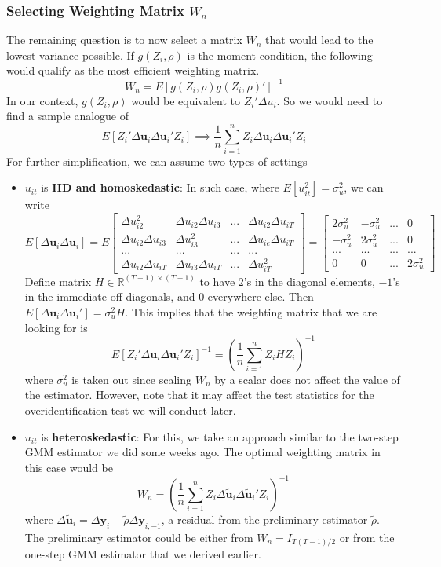 \documentclass[12pt]{article}
\theoremstyle{definition}
\theoremstyle{property}
\theoremstyle{assumption}
\theoremstyle{example}
\theoremstyle{comment}
\begin{document}
\subsubsection{Selecting Weighting Matrix $W_n$}
The remaining question is to now select a matrix $W_n$ that would lead to the lowest variance possible. If $g(Z_i,\rho)$ is the moment condition, the following would qualify as the most efficient weighting matrix.
\[
W_n = E[g(Z_i,\rho)g(Z_i,\rho)']^{-1}
\]
In our context, $g(Z_i,\rho)$ would be equivalent to $Z_i'\Delta u_i$. So we would need to find a sample analogue of
\[
E[Z_i'\Delta \mathbf{u}_i \Delta \mathbf{u}_i'Z_i] \implies \frac{1}{n}\sum_{i=1}^nZ_i\Delta \mathbf{u}_i \Delta \mathbf{u}_i' Z_i
\]
For further simplification, we can assume two types of settings
\begin{itemize}
\item $u_{it}$ is \textbf{IID and homoskedastic}: In such case, where $E[u_{it}^2]=\sigma_u^2$,  we can write
\[
E[\Delta \mathbf{u}_i \Delta \mathbf{u}_i]=E\begin{bmatrix}\Delta u_{i2}^2 & \Delta u_{i2}\Delta u_{i3} & ... & \Delta u_{i2}\Delta u_{iT} \\\Delta u_{i2}\Delta u_{i3} & \Delta u_{i3}^2 & ... & \Delta u_{ie}\Delta u_{iT}\\ ... & ...  & ... & ... \\  \Delta u_{i2}\Delta u_{iT} & \Delta u_{i3}\Delta u_{iT} & ... & \Delta u_{iT}^2  \end{bmatrix}=\begin{bmatrix}2\sigma_u^2& -\sigma_u^2 &... &0\\ -\sigma_u^2 & 2\sigma_u^2 & ... &0 \\ ...&...&...&...\\ 0 & 0 & ... & 2\sigma_u^2\end{bmatrix}
\]
Define matrix $H\in\mathbb{R}^{(T-1)\times(T-1)}$ to have $2$'s in the diagonal elements, $-1$'s in the immediate off-diagonals, and $0$ everywhere else. Then $E[\Delta \mathbf{u}_i \Delta \mathbf{u}_i']=\sigma_u^2 H$. This implies that the weighting matrix that we are looking for is
\[
E[Z_i'\Delta \mathbf{u}_i \Delta \mathbf{u}_i'Z_i]^{-1}=\left(\frac{1}{n}\sum_{i=1}^nZ_iH Z_i\right)^{-1}
\]
where $\sigma_u^2$ is taken out since scaling $W_n$ by a scalar does not affect the value of the estimator. However, note that it may affect the test statistics for the overidentification test we will conduct later. 
\item $u_{it}$ is \textbf{heteroskedastic}: For this, we take an approach similar to the two-step GMM estimator we did some weeks ago. The optimal weighting matrix in this case would be
\[
W_n=\left(\frac{1}{n}\sum_{i=1}^nZ_i\Delta\tilde{\mathbf{u}}_i \Delta\tilde{\mathbf{u}}_i' Z_i\right)^{-1} 
\]
where $\Delta\tilde{\mathbf{u}}_i=\Delta \mathbf{y}_ i -\tilde{\rho}\Delta \mathbf{y}_{i,-1}$, a residual from the preliminary estimator $\tilde{\rho}$. The preliminary estimator could be either from $W_n = I_{T(T-1)/2}$ or from the one-step GMM estimator that we derived earlier. 
\end{itemize}
\end{document}
